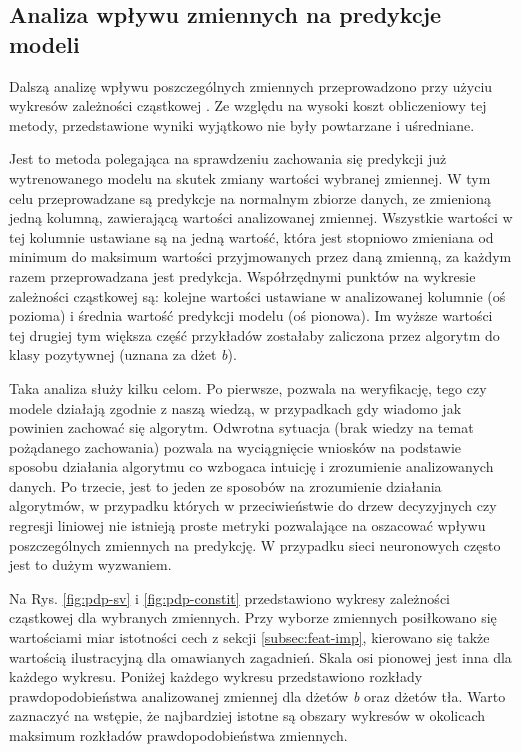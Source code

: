 \newpage
\FloatBarrier
\subsection{Analiza wpływu zmiennych na predykcje modeli}

Dalszą analizę wpływu poszczególnych zmiennych przeprowadzono przy użyciu wykresów zależności cząstkowej . Ze względu na wysoki koszt obliczeniowy tej metody, przedstawione wyniki wyjątkowo nie były powtarzane i uśredniane.

Jest to metoda polegająca na sprawdzeniu zachowania się predykcji już wytrenowanego modelu na skutek zmiany wartości wybranej zmiennej. W tym celu przeprowadzane są predykcje na normalnym zbiorze danych, ze zmienioną jedną kolumną, zawierającą wartości analizowanej zmiennej. Wszystkie wartości w tej kolumnie ustawiane są na jedną wartość, która jest stopniowo zmieniana od minimum do maksimum wartości przyjmowanych przez daną zmienną, za każdym razem przeprowadzana jest predykcja. Współrzędnymi punktów na wykresie zależności cząstkowej są: kolejne wartości ustawiane w analizowanej kolumnie (oś pozioma) i średnia wartość predykcji modelu (oś pionowa). Im wyższe wartości tej drugiej tym większa część przykładów zostałaby zaliczona przez algorytm do klasy pozytywnej (uznana za dżet \textit{b}).

Taka analiza służy kilku celom. 
Po pierwsze, pozwala na weryfikację, tego czy modele działają zgodnie z naszą wiedzą, w przypadkach gdy wiadomo jak powinien zachować się algorytm. 
Odwrotna sytuacja (brak wiedzy na temat pożądanego zachowania) pozwala na wyciągnięcie wniosków na podstawie sposobu działania algorytmu co wzbogaca intuicję i zrozumienie analizowanych danych.
Po trzecie, jest to jeden ze sposobów na zrozumienie działania algorytmów, w przypadku których w przeciwieństwie do drzew decyzyjnych czy regresji liniowej nie istnieją proste metryki pozwalające na oszacować wpływu poszczególnych zmiennych na predykcję. W przypadku sieci neuronowych często jest to dużym wyzwaniem.

Na Rys. \ref{fig:pdp-sv} i \ref{fig:pdp-constit} przedstawiono wykresy zależności cząstkowej dla wybranych zmiennych. Przy wyborze zmiennych posiłkowano się wartościami miar istotności cech z sekcji \ref{subsec:feat-imp}, kierowano się także wartością ilustracyjną dla omawianych zagadnień.
Skala osi pionowej jest inna dla każdego wykresu.
Poniżej każdego wykresu przedstawiono rozkłady prawdopodobieństwa analizowanej zmiennej dla dżetów \textit{b} oraz dżetów tła.
Warto zaznaczyć na wstępie, że najbardziej istotne są obszary wykresów w okolicach maksimum rozkładów prawdopodobieństwa zmiennych.

